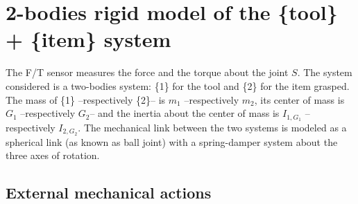 \documentclass[\main/main.tex]{subfiles}
\begin{document}
\newpage

\section{2-bodies rigid model of the \{tool\} + \{item\} system}
\label{appendix:rmsd}



The F/T sensor measures the force and the torque about the joint $S$.
The system considered is a two-bodies system: \{1\} for the tool and \{2\} for the item grasped. The mass of \{1\} –respectively \{2\}– is $m_1$ –respectively $m_2$, its center of mass is $G_1$ –respectively $G_2$– and the inertia about the center of mass is $I_{1, G_1}$ –respectively $I_{2, G_2}$. The mechanical link between the two systems is modeled as a spherical link (as known as ball joint) with a spring-damper system about the three axes of rotation.

\subsection{External mechanical actions}
\end{document}
